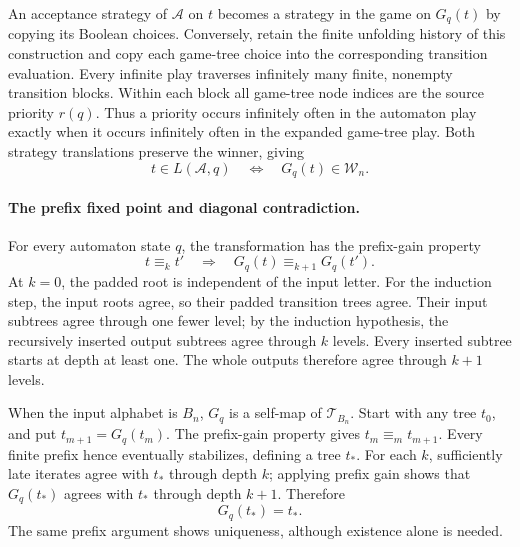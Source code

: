 An acceptance strategy of
\(\mathcal A\) on \(t\)
becomes a strategy in
the game on \(G_q(t)\)
by copying its Boolean
choices. Conversely, retain
the finite unfolding
history of this construction
and copy each game-tree
choice into the corresponding
transition evaluation.
Every infinite play traverses
infinitely many finite,
nonempty transition blocks.
Within each block all
game-tree node indices
are the source priority
\(r(q)\).
Thus a priority occurs
infinitely often in the
automaton play exactly
when it occurs infinitely
often in the expanded
game-tree play.
Both strategy translations
preserve the winner, giving
\[
 t\in L(\mathcal A,q)
 \quad\Longleftrightarrow\quad
 G_q(t)\in\mathcal W_n.
\]

\paragraph{The prefix fixed point and diagonal contradiction.}
For every automaton state
\(q\), the transformation
has the prefix-gain property
\[
 t\equiv_k t'
 \quad\Longrightarrow\quad
 G_q(t)\equiv_{k+1}G_q(t').
\]
At \(k=0\), the padded
root is independent of
the input letter.
For the induction step,
the input roots agree,
so their padded transition
trees agree. Their input
subtrees agree through
one fewer level; by
the induction hypothesis,
the recursively inserted
output subtrees agree
through \(k\) levels.
Every inserted subtree
starts at depth at
least one. The whole
outputs therefore agree
through \(k+1\) levels.

When the input alphabet
is \(B_n\), \(G_q\)
is a self-map of
\(\mathcal T_{B_n}\).
Start with any tree
\(t_0\), and put
\(t_{m+1}=G_q(t_m)\).
The prefix-gain property
gives
\(t_m\equiv_m t_{m+1}\).
Every finite prefix hence
eventually stabilizes,
defining a tree \(t_*\).
For each \(k\), sufficiently
late iterates agree with
\(t_*\) through depth \(k\);
applying prefix gain shows
that \(G_q(t_*)\) agrees
with \(t_*\) through
depth \(k+1\).
Therefore
\[
 G_q(t_*)=t_*.
\]
The same prefix argument
shows uniqueness, although
existence alone is needed.

